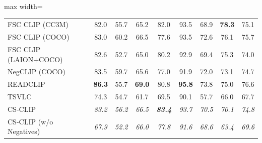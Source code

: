 \begin{table}[t]
\begin{adjustbox}{max width=\textwidth}
\begin{tabular}{p{5cm}c|c|c|c|c|c|c|c}
    FSC CLIP (CC3M) & 82.0 & 55.7 & 65.2 & 82.0 & 93.5 & 68.9 & \textbf{78.3} & 75.1 \\
    FSC CLIP (COCO) & 83.0 & 60.2 & 66.5 & 77.6 & 93.5 & 72.6 & 76.1 & 75.7 \\
    FSC CLIP (LAION+COCO) & 82.6 & 52.7 & 65.0 & 80.2 & 92.9 & 69.4 & 75.3 & 74.0 \\
    NegCLIP (COCO) & 83.5 & 59.7 & 65.6 & 77.0 & 91.9 & 72.0 & 73.1 & 74.7 \\
    READCLIP & \textbf{86.3} & 55.7 & \textbf{69.0} & 80.8 & \textbf{95.8} & 73.8 & 75.0 & 76.6 \\
    TSVLC & 74.3 & 54.7 & 61.7 & 69.5 & 90.1 & 57.7 & 66.0 & 67.7 \\
    \midrule
    CS-CLIP & \emph{83.2} & \emph{56.2} & \emph{66.5} & \emph{\textbf{83.4}} & \emph{93.7} & \emph{70.5} & \emph{70.1} & \emph{74.8} \\
    CS-CLIP (w/o Negatives) & \emph{67.9} & \emph{52.2} & \emph{66.0} & \emph{77.8} & \emph{91.6} & \emph{68.6} & \emph{63.4} & \emph{69.6} \\
    \bottomrule
  \end{tabular}
  \end{adjustbox}
\end{table}

